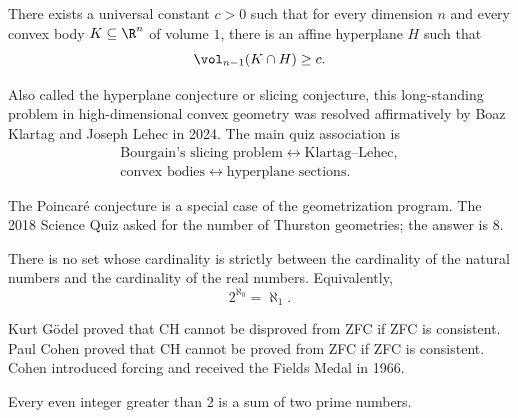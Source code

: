     \begin{theorem}
        There exists a universal constant $c>0$ such that for every dimension $n$
        and every convex body $K\subseteq\R^n$ of volume $1$, there is an
        affine hyperplane $H$ such that
        \[
            \vol_{n-1}(K\cap H)\geq c.
        \]
    \end{theorem}

    \begin{remark}
        Also called the hyperplane conjecture or slicing conjecture, this
        long-standing problem in high-dimensional convex geometry was resolved
        affirmatively by Boaz Klartag and Joseph Lehec in 2024. The main quiz
        association is
        \[
            \begin{gathered}
                \text{Bourgain's slicing problem}
                \longleftrightarrow \text{Klartag--Lehec},\\
                \text{convex bodies}
                \longleftrightarrow \text{hyperplane sections}.
            \end{gathered}
        \]
    \end{remark}

    \begin{remark}
        The Poincaré conjecture is a special case of the geometrization program.
        The 2018 Science Quiz asked for the number of Thurston geometries; the
        answer is $8$.
    \end{remark}

    \begin{hypothesis}
        There is no set whose cardinality is strictly between the cardinality of
        the natural numbers and the cardinality of the real numbers. Equivalently,
        \[
            2^{\aleph_0}=\aleph_1.
        \]
    \end{hypothesis}

    \begin{remark}
        Kurt Gödel proved that CH cannot be disproved from ZFC if ZFC is
        consistent. Paul Cohen proved that CH cannot be proved from ZFC if ZFC
        is consistent. Cohen introduced forcing and received the Fields Medal in
        1966.
    \end{remark}

    \begin{openproblem}
        Every even integer greater than $2$ is a sum of two prime numbers.
    \end{openproblem}

